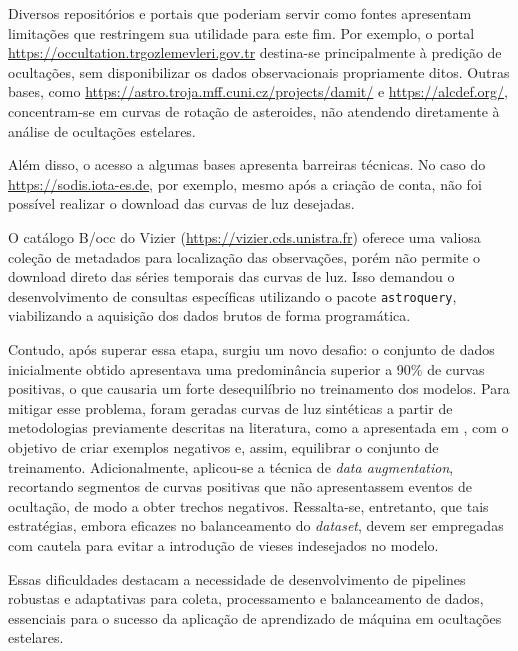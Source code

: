 \documentclass[12pt]{article}
\numberwithin{equation}{section}
\begin{document}
Diversos repositórios e portais que poderiam servir como fontes apresentam limitações que restringem sua utilidade para este fim. Por exemplo, o portal \url{https://occultation.trgozlemevleri.gov.tr} destina-se principalmente à predição de ocultações, sem disponibilizar os dados observacionais propriamente ditos. Outras bases, como \url{https://astro.troja.mff.cuni.cz/projects/damit/} e \url{https://alcdef.org/}, concentram-se em curvas de rotação de asteroides, não atendendo diretamente à análise de ocultações estelares.

Além disso, o acesso a algumas bases apresenta barreiras técnicas. No caso do \url{https://sodis.iota-es.de}, por exemplo, mesmo após a criação de conta, não foi possível realizar o download das curvas de luz desejadas.

O catálogo B/occ do Vizier (\url{https://vizier.cds.unistra.fr}) oferece uma valiosa coleção de metadados para localização das observações, porém não permite o download direto das séries temporais das curvas de luz. Isso demandou o desenvolvimento de consultas específicas utilizando o pacote \texttt{astroquery}, viabilizando a aquisição dos dados brutos de forma programática.

Contudo, após superar essa etapa, surgiu um novo desafio: o conjunto de dados inicialmente obtido apresentava uma predominância superior a 90\% de curvas positivas, o que causaria um forte desequilíbrio no treinamento dos modelos. Para mitigar esse problema, foram geradas curvas de luz sintéticas a partir de metodologias previamente descritas na literatura, como a apresentada em \cite{Simulator}, com o objetivo de criar exemplos negativos e, assim, equilibrar o conjunto de treinamento. Adicionalmente, aplicou-se a técnica de \textit{data augmentation}, recortando segmentos de curvas positivas que não apresentassem eventos de ocultação, de modo a obter trechos negativos. Ressalta-se, entretanto, que tais estratégias, embora eficazes no balanceamento do \textit{dataset}, devem ser empregadas com cautela para evitar a introdução de vieses indesejados no modelo.

Essas dificuldades destacam a necessidade de desenvolvimento de pipelines robustas e adaptativas para coleta, processamento e balanceamento de dados, essenciais para o sucesso da aplicação de aprendizado de máquina em ocultações estelares.






\end{document}
